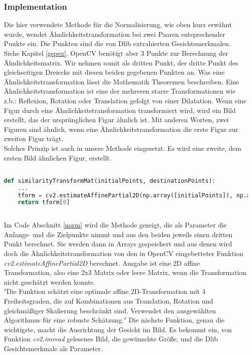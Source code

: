 \subsubsection{Implementation}

Die hier verwendete Methode für die Normalisierung, wie oben kurz erwähnt wurde, wendet
Ähnlichkeitstransformation bei zwei Paaren entsprechender Punkte ein.
Die Punkten sind die von Dlib extrahierten Gesichtsmerkmalen. Siehe Kapitel \ref{gspex}.
\justify
OpenCV benötigt aber 3 Punkte zur Berechnung der Ähnlichkeitsmatrix.
Wir nehmen somit als dritten Punkt, der dritte Punkt des gleichseitigen Dreiecks mit diesen beiden gegebenen Punkten an.
\justify 
Was eine Ähnlichkeitstransformation lässt die Mathematik Theoremen beschreiben. 
Eine Ähnlichkeitstransformation ist eine der mehreren starre Transformationen wie z.b.: Reflexion, Rotation oder Translation gefolgt von einer Dilatation. 
\justify
Wenn eine Figur durch eine Ähnlichkeitstransformation transformiert wird, wird ein Bild erstellt, das der ursprünglichen Figur ähnlich ist. Mit anderen Worten, zwei Figuren sind ähnlich, wenn eine Ähnlichkeitstransformation die erste Figur zur zweiten Figur trägt.\\

Solches Prinzip ist auch in unsere Methode eingesetzt. Es wird eine zweite, dem ersten Bild ähnlichen Figur, erstellt. \\

\begin{lstlisting}[caption=Implementation Normalisierung,language=python,label=norm]

def similarityTransformMat(initialPoints, destinationPoints):
	...
	tform = cv2.estimateAffinePartial2D(np.array([initialPoints]), np.array([destinationPoints]))
	return tform[0]
	
\end{lstlisting}

Im Code Abschnitt \ref{norm} wird die Methode gezeigt, die als Parameter die Anfangs- und die Zielpunkte nimmt und aus den beiden jeweils einen dritten Punkt berechnet.
\justify
Sie werden dann in Arrays gespeichert und aus denen wird doch die Ähnlichkeitstransformation von den in OpenCV eingebetteter Funktion \textit{cv2.estimateAffinePartial2D} berechnet.
\justify 
Ausgabe ist eine 2D affine Transformation, also eine 2x3 Matrix oder leere Matrix, wenn die Transformation nicht geschätzt werden konnte.\\
"Die Funktion schätzt eine optimale affine 2D-Transformation mit 4 Freiheitsgraden, die auf Kombinationen aus Translation, Rotation und gleichmäßiger Skalierung beschränkt sind. Verwendet den ausgewählten Algorithmus für eine robuste Schätzung."\cite{opencv_library}
\justify
Die nächste Funktion, genau die wichtigste, macht die Ausrichtung der Gesicht im Bild. 
Es bekommt ein, von Funktion \textit{cv2.imread} gelesenes Bild, die gewünschte Größe, und die Dlib Gesichtsmerkmale als Parameter. 

